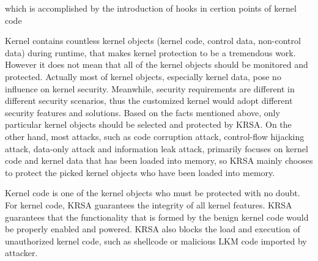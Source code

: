 \documentclass[conference]{IEEEtran}
\begin{document}
which is accomplished by the introduction of hooks in certion points of kernel code



Kernel contains countless kernel objects (kernel code, control data, non-control data) during runtime, that makes kernel protection to be a tremendous work. However it does not mean that all of the kernel objects should be monitored and protected. Actually most of kernel objects, especially kernel data, pose no influence on kernel security. Meanwhile, security requirements are different in different security scenarios, thus the customized kernel would adopt different security features and solutions. Based on the facts mentioned above, only particular kernel objects should be selected and protected by KRSA. On the other hand, most attacks, such as code corruption attack, control-flow hijacking attack, data-only attack and information leak attack, primarily focuses on kernel code and kernel data that has been loaded into memory, so KRSA mainly chooses to protect the picked kernel objects who have been loaded into memory. 

Kernel code is one of the kernel objects who must be protected with no doubt.
For kernel code, KRSA guarantees the integrity of all kernel features. KRSA guarantees that the functionality that is formed by the benign kernel code would be properly enabled and powered. KRSA also blocks the load and execution of unauthorized kernel code, such as shellcode or malicious LKM code imported by attacker. 
\end{document}
